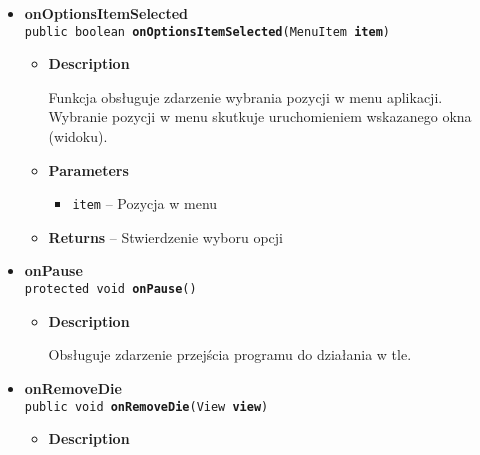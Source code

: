 \documentclass[11pt,a4paper]{article}
\begin{document}
{{{{{\begin{itemize}
{\begin{itemize}
{Tworzy menu programu i wyświetla je na żądanie użytkownika.
}
\item{
{\bf  Parameters}
  \begin{itemize}
   \item{
\texttt{menu} -- Menu programu}
  \end{itemize}
}%
\item{{\bf  Returns} -- 
Wartość \texttt{\small true} 
}%
\end{itemize}
}%
\item{ 
\hypertarget{com.example.kostkadogry.MainActivity.onOptionsItemSelected(MenuItem)}{{\bf  onOptionsItemSelected}\\}
\texttt{public boolean\ {\bf  onOptionsItemSelected}(\texttt{MenuItem} {\bf  item})
\label{com.example.kostkadogry.MainActivity.onOptionsItemSelected(MenuItem)}}%
\begin{itemize}
\item{
{\bf  Description}

Funkcja obsługuje zdarzenie wybrania pozycji w menu aplikacji. Wybranie pozycji w menu skutkuje uruchomieniem wskazanego okna (widoku).
}
\item{
{\bf  Parameters}
  \begin{itemize}
   \item{
\texttt{item} -- Pozycja w menu}
  \end{itemize}
}%
\item{{\bf  Returns} -- 
Stwierdzenie wyboru opcji 
}%
\end{itemize}
}%
\item{ 
\hypertarget{com.example.kostkadogry.MainActivity.onPause()}{{\bf  onPause}\\}
\texttt{protected void\ {\bf  onPause}()
\label{com.example.kostkadogry.MainActivity.onPause()}}%
\begin{itemize}
\item{
{\bf  Description}

Obsługuje zdarzenie przejścia programu do działania w tle.
}
\end{itemize}
}%
\item{ 
\hypertarget{com.example.kostkadogry.MainActivity.onRemoveDie(View)}{{\bf  onRemoveDie}\\}
\texttt{public void\ {\bf  onRemoveDie}(\texttt{View} {\bf  view})
\label{com.example.kostkadogry.MainActivity.onRemoveDie(View)}}%
\begin{itemize}
\item{
{\bf  Description}

}
\end{itemize}}
\end{itemize}}}}}}
\end{document}
